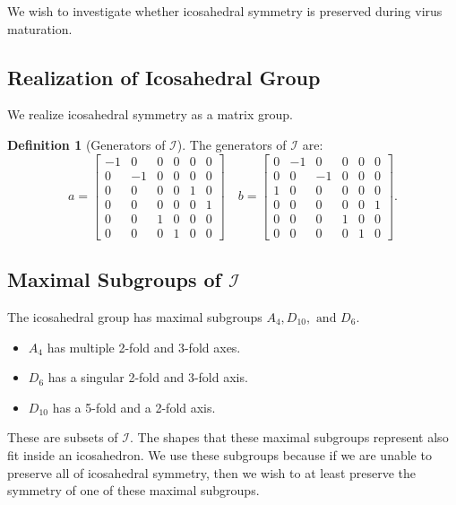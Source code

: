 \documentclass[a4paper,10pt]{article}
\theoremstyle{plain}
\theoremstyle{definition}
\newtheorem{Definition}[Theorem]{Definition}
\theoremstyle{remark}
\begin{document}
We wish to investigate whether icosahedral symmetry is preserved during virus maturation.

\subsection{Realization of Icosahedral Group}
We realize icosahedral symmetry as a matrix group.
\begin{Definition}[Generators of \(\mathcal{I}\)]
    The generators of \(\mathcal{I}\) are:
    \[a = \begin{bmatrix}
    -1 & 0  & 0 & 0 & 0 & 0 \\
    0  & -1 & 0 & 0 & 0 & 0 \\
    0  & 0  & 0 & 0 & 1 & 0 \\
    0  & 0  & 0 & 0 & 0 & 1 \\
    0  & 0  & 1 & 0 & 0 & 0 \\
    0  & 0  & 0 & 1 & 0 & 0
\end{bmatrix} \quad b = \begin{bmatrix}
    0 & -1 & 0  & 0 & 0 & 0 \\
    0 & 0  & -1 & 0 & 0 & 0 \\
    1 & 0  & 0  & 0 & 0 & 0 \\
    0 & 0  & 0  & 0 & 0 & 1 \\
    0 & 0  & 0  & 1 & 0 & 0 \\
    0 & 0  & 0  & 0 & 1 & 0
\end{bmatrix}.\]
\end{Definition}

\subsection{Maximal Subgroups of \(\mathcal{I}\)}
The icosahedral group has maximal subgroups \(A_4, D_{10}, \text{ and } D_6\).
\begin{itemize}
    \item \(A_4\) has multiple 2-fold and 3-fold axes.
    \item \(D_{6}\) has a singular 2-fold and 3-fold axis.
    \item \(D_{10}\) has a 5-fold and a 2-fold axis.
\end{itemize}
These are subsets of \(\mathcal{I}\).
The shapes that these maximal subgroups represent also fit inside an icosahedron.
We use these subgroups because if we are unable to preserve all of icosahedral symmetry, then we wish to at least preserve the symmetry of one of these maximal subgroups.
\end{document}
